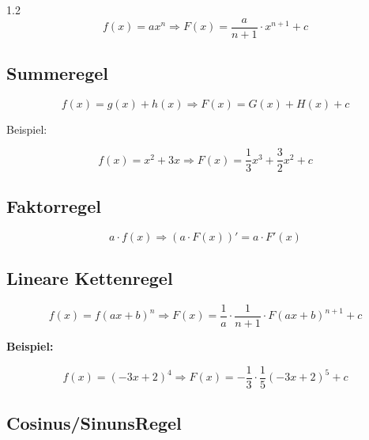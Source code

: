 \documentclass{article}
\newcommand{\Zeilenabstand}{1.2}
\begin{document}
\begin{spacing}{\Zeilenabstand}
            \begin{equation}
                f(x)=ax^{n} \Rightarrow F(x)= \frac{a}{n+1} \cdot x^{n+1} + c
            \end{equation}

        \subsection{Summeregel}

            \begin{equation}
                f(x)= g(x) + h(x) \Rightarrow F(x) = G(x) + H(x) + c     
            \end{equation}

            Beispiel:

            \begin{equation}
                f(x) = x^{2} + 3x \Rightarrow F(x)= \frac{1}{3}x^{3}+\frac{3}{2}x^{2} + c
            \end{equation}
            
        \subsection{Faktorregel}

            \begin{equation}
                a\cdot f(x) \Rightarrow (a\cdot F(x))'= a\cdot F'(x)
            \end{equation}
        
        \subsection{Lineare Kettenregel}

            \begin{equation}
                f(x)=f(ax+b)^{n} \Rightarrow F(x)= \frac{1}{a}\cdot \frac{1}{n+1}\cdot F(ax+b)^{n+1} +c 
            \end{equation}

            \textbf{Beispiel:}

            \begin{equation}
                f(x) = (-3x+2)^{4} \Rightarrow F(x)=-\frac{1}{3}\cdot\frac{1}{5}(-3x+2)^{5}+c
            \end{equation}

        \subsection{Cosinus/SinunsRegel}
            

\end{spacing}
\end{document}
